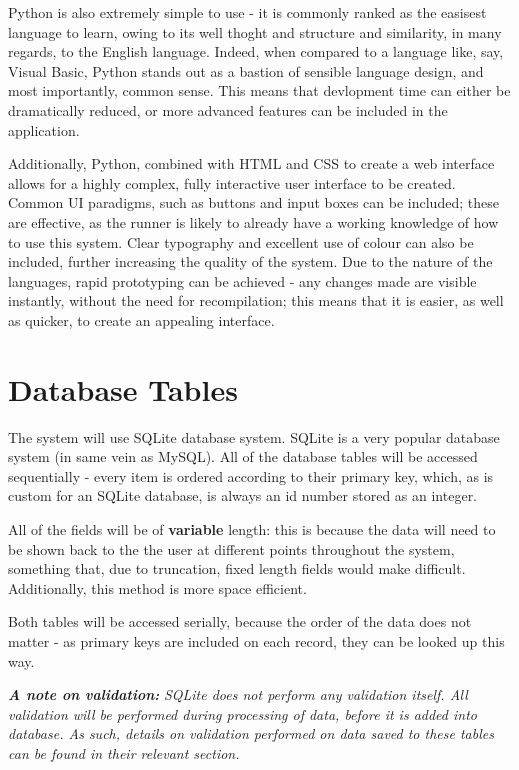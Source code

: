 \documentclass{article}[12pt,a4paper]
\begin{document}
Python is also extremely simple to use - it is commonly ranked as the easisest language to learn, owing to its well thoght and structure and similarity, in many regards, to the English language. Indeed, when compared to a language like, say, Visual Basic, Python stands out as a bastion of sensible language design, and most importantly, common sense. This means that devlopment time can either be dramatically reduced, or more advanced features can be included in the application.

Additionally, Python, combined with HTML and CSS to create a web interface allows for a highly complex, fully interactive user interface to be created. Common UI paradigms, such as buttons and input boxes can be included; these are effective, as the runner is likely to already have a working knowledge of how to use this system. Clear typography and excellent use of colour can also be included, further increasing the quality of the system. Due to the nature of the languages, rapid prototyping can be achieved - any changes made are visible instantly, without the need for recompilation; this means that it is easier, as well as quicker, to create an appealing interface.

\section{Database Tables}
The system will use SQLite database system. SQLite is a very popular database system (in same vein as MySQL). All of the database tables will be accessed sequentially - every item is ordered according to their primary key, which, as is custom for an SQLite database, is always an id number stored as an integer.

All of the fields will be of \textbf{variable} length: this is because the data will need to be shown back to the the user at different points throughout the system, something that, due to truncation, fixed length fields would make difficult. Additionally, this method is more space efficient.

Both tables will be accessed serially, because the order of the data does not matter - as primary keys are included on each record, they can be looked up this way.

\textbf{\textit{A note on validation: }}\textit{SQLite does not perform any validation itself. All validation will be performed during processing of data, before it is added into database. As such, details on validation performed on data saved to these tables can be found in their relevant section.}
\end{document}
